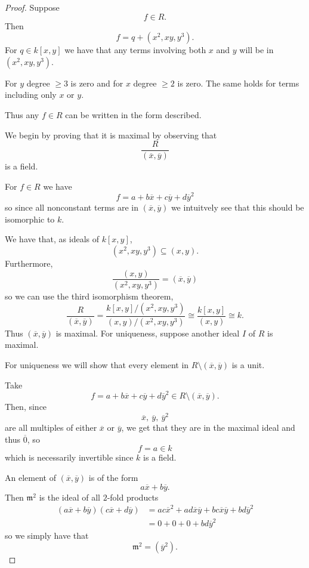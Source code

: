 \documentclass[11pt]{article}
\begin{document}
\begin{proof}
    Suppose 
    \[
        f \in R. 
    \]
    Then 
    \[
        f = q + (x^2, xy, y^3).  
    \]
    For $q \in k[x,y]$ we have that 
    any terms involving 
    both $x$ and $y$ will be in $(x^2, xy, y^3)$. 
    
    For $y$ degree $\geq 3$ is zero 
    and for $x$ degree $\geq 2$ is 
    zero. 
    The same holds for terms including only $x$ or 
    $y$.

    Thus any $f \in R$ can be written in the form 
    described. 

    We begin by proving that it is maximal by observing that 
    \[
        \frac{R}{(\overline x, \overline y)}
    \]
    is a field. 

    For $f \in R$ we have 
    \[
        f = a + b\overline x + c \overline y + 
        d \overline y^2 
    \]
    so since all nonconstant terms are in 
    $(\overline x, \overline y)$ we intuitvely 
    see that this should be isomorphic to $k$. 

    We have that, as ideals of $k[x,y]$, 
    \[
        (x^2, xy, y^3) \subseteq (x,y). 
    \]
    Furthermore, 
    \[
        \frac{(x,y)}{(x^2, xy, y^3)} 
        = (\overline x, \overline y)
    \]
    so 
    we can use the third isomorphism theorem, 
    \[
        \frac{R}{(\overline x, \overline y)} 
        = \frac{k[x,y]/(x^2, xy, y^3)}{(x,y)/(x^2, xy, y^3)}
        \cong \frac{k[x,y]}{(x,y)} \cong k. 
    \]
    Thus $(\overline x, \overline y)$ is maximal. 
    For uniqueness, suppose another ideal 
    $I$ of $R$ is maximal. 

    For uniqueness we will show that every element 
    in $R \setminus (\overline x, \overline y)$ is 
    a unit. 

    Take 
    \[
        f = a + b\overline x + c \overline y + 
        d\overline y^2 \in R\setminus(\overline x, \overline y). 
    \]
    Then, since 
    \[
        \overline x, \ \overline y, \ \overline y^2  
    \]
    are all multiples of either $\overline x$ or $\overline y$, 
    we get that they are in the maximal ideal and thus 
    $\overline 0$, so 
    \[
        f = a \in k 
    \]
    which is necessarily invertible since $k$ is a field. 

    An element of $(\overline x, \overline y)$ is 
    of the form 
    \[
        a\overline x + b \overline y. 
    \]
    Then $\mathfrak m^2$ is the ideal of 
    all $2$-fold products 
    \begin{align*}
        (a \overline x + b \overline y)
        (c \overline x + d \overline y) 
        &= ac\overline x^2 + 
        ad\overline x \overline y + 
        bc\overline x \overline y + 
        bd\overline y^2 \\ 
        &= 0 + 0 + 0 + bd\overline y^2 
    \end{align*}
    so we simply have that 
    \[
        \mathfrak m^2 = (\overline y^2). 
    \]


\end{proof}
\end{document}

